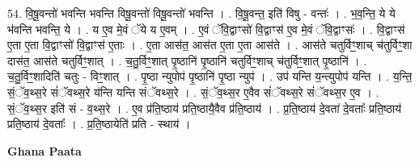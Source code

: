 \documentclass[17pt]{extarticle}
\begin{document}
54. वि॒षू॒वन्तो॑ भवन्ति भवन्ति विषू॒वन्तो॑ विषू॒वन्तो॑ भवन्ति । . वि॒षू॒वन्त॒ इति॑ विषु - वन्तः॑ । . भ॒व॒न्ति॒ ये ये भ॑वन्ति भवन्ति॒ ये । . य ए॒व मे॒वं ॅये य ए॒वम् । . ए॒वं ॅवि॒द्वाꣳसो॑ वि॒द्वाꣳस॑ ए॒व मे॒वं ॅवि॒द्वाꣳसः॑ । . वि॒द्वाꣳस॑ ए॒ता ए॒ता वि॒द्वाꣳसो॑ वि॒द्वाꣳस॑ ए॒ताः । . ए॒ता आस॑त॒ आस॑त ए॒ता ए॒ता आस॑ते । . आस॑ते चतुर्विꣳ॒॒शाच् च॑तुर्विꣳ॒॒शा दास॑त॒ आस॑ते चतुर्विꣳ॒॒शात् । . च॒तु॒र्विꣳ॒॒शात् पृ॒ष्ठानि॑ पृ॒ष्ठानि॑ चतुर्विꣳ॒॒शाच् च॑तुर्विꣳ॒॒शात् पृ॒ष्ठानि॑ । . च॒तु॒र्विꣳ॒॒शादिति॑ चतुः - विꣳ॒॒शात् । . पृ॒ष्ठा न्युपोप॑ पृ॒ष्ठानि॑ पृ॒ष्ठा न्युप॑ । . उप॑ यन्ति य॒न्त्युपोप॑ यन्ति । . य॒न्ति॒ सं॒ॅव॒थ्स॒रे सं॑ॅवथ्स॒रे य॑न्ति यन्ति संॅवथ्स॒रे । . सं॒ॅव॒थ्स॒र ए॒वैव सं॑ॅवथ्स॒रे सं॑ॅवथ्स॒र ए॒व । . सं॒ॅव॒थ्स॒र इति॑ सं - व॒थ्स॒रे । . ए॒व प्र॑ति॒ष्ठाय॑ प्रति॒ष्ठायै॒वैव प्र॑ति॒ष्ठाय॑ । . प्र॒ति॒ष्ठाय॑ दे॒वता॑ दे॒वताः᳚ प्रति॒ष्ठाय॑ प्रति॒ष्ठाय॑ दे॒वताः᳚ । . प्र॒ति॒ष्ठायेति॑ प्रति - स्थाय॑ । \newline

\textbf{Ghana Paata } \newline
\end{document}
